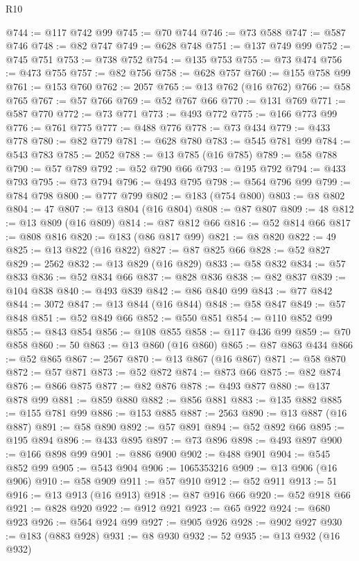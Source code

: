 \begin{lexlean}{R10}
\begin{coremodule}
@744 := @117 @742 @99
@745 := @70 @744
@746 := @73 @588
@747 := @587 @746
@748 := @82 @747
@749 := @628 @748
@751 := @137 @749 @99
@752 := @745 @751
@753 := @738 @752
@754 := @135 @753
@755 := @73 @474
@756 := @473 @755
@757 := @82 @756
@758 := @628 @757
@760 := @155 @758 @99
@761 := @153 @760
@762 := 2057
@765 := @13 @762 (@16 @762)
@766 := @58 @765
@767 := @57 @766
@769 := @52 @767 @66
@770 := @131 @769
@771 := @587 @770
@772 := @73 @771
@773 := @493 @772
@775 := @166 @773 @99
@776 := @761 @775
@777 := @488 @776
@778 := @73 @434
@779 := @433 @778
@780 := @82 @779
@781 := @628 @780
@783 := @545 @781 @99
@784 := @543 @783
@785 := 2052
@788 := @13 @785 (@16 @785)
@789 := @58 @788
@790 := @57 @789
@792 := @52 @790 @66
@793 := @195 @792
@794 := @433 @793
@795 := @73 @794
@796 := @493 @795
@798 := @564 @796 @99
@799 := @784 @798
@800 := @777 @799
@802 := @183 (@754 @800)
@803 := @8 @802
@804 := 47
@807 := @13 @804 (@16 @804)
@808 := @87 @807
@809 := 48
@812 := @13 @809 (@16 @809)
@814 := @87 @812 @66
@816 := @52 @814 @66
@817 := @808 @816
@820 := @183 (@86 @817 @99)
@821 := @8 @820
@822 := 49
@825 := @13 @822 (@16 @822)
@827 := @87 @825 @66
@828 := @52 @827
@829 := 2562
@832 := @13 @829 (@16 @829)
@833 := @58 @832
@834 := @57 @833
@836 := @52 @834 @66
@837 := @828 @836
@838 := @82 @837
@839 := @104 @838
@840 := @493 @839
@842 := @86 @840 @99
@843 := @77 @842
@844 := 3072
@847 := @13 @844 (@16 @844)
@848 := @58 @847
@849 := @57 @848
@851 := @52 @849 @66
@852 := @550 @851
@854 := @110 @852 @99
@855 := @843 @854
@856 := @108 @855
@858 := @117 @436 @99
@859 := @70 @858
@860 := 50
@863 := @13 @860 (@16 @860)
@865 := @87 @863 @434
@866 := @52 @865
@867 := 2567
@870 := @13 @867 (@16 @867)
@871 := @58 @870
@872 := @57 @871
@873 := @52 @872
@874 := @873 @66
@875 := @82 @874
@876 := @866 @875
@877 := @82 @876
@878 := @493 @877
@880 := @137 @878 @99
@881 := @859 @880
@882 := @856 @881
@883 := @135 @882
@885 := @155 @781 @99
@886 := @153 @885
@887 := 2563
@890 := @13 @887 (@16 @887)
@891 := @58 @890
@892 := @57 @891
@894 := @52 @892 @66
@895 := @195 @894
@896 := @433 @895
@897 := @73 @896
@898 := @493 @897
@900 := @166 @898 @99
@901 := @886 @900
@902 := @488 @901
@904 := @545 @852 @99
@905 := @543 @904
@906 := 1065353216
@909 := @13 @906 (@16 @906)
@910 := @58 @909
@911 := @57 @910
@912 := @52 @911
@913 := 51
@916 := @13 @913 (@16 @913)
@918 := @87 @916 @66
@920 := @52 @918 @66
@921 := @828 @920
@922 := @912 @921
@923 := @65 @922
@924 := @680 @923
@926 := @564 @924 @99
@927 := @905 @926
@928 := @902 @927
@930 := @183 (@883 @928)
@931 := @8 @930
@932 := 52
@935 := @13 @932 (@16 @932)

\end{coremodule}
\end{lexlean}
